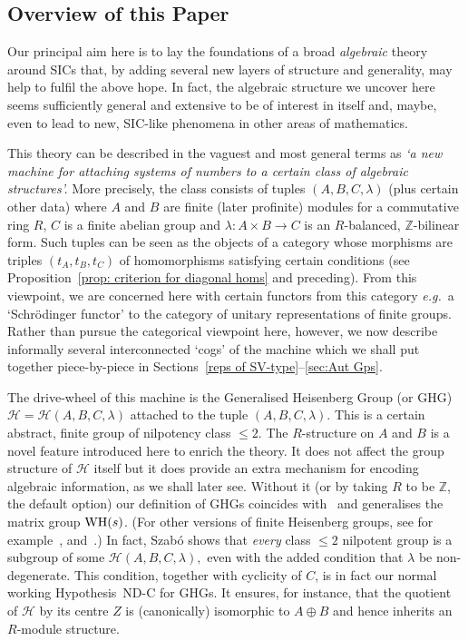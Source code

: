 \documentclass[12pt]{article}
\newcounter{example}[section]
\newcommand{\bbZ}{\ensuremath{\mathbb{Z}}}
\newcommand{\cH}{\ensuremath{\mathcal{H}}}
\newcommand{\eg}{\emph{e.g.}}
\newcommand{\Hei}[4]{\cH({#1},{#2},{#3},{#4})}
\newcommand{\HeiStan}{\Hei{A}{B}{C}{\lambda}}
\begin{document}
\subsection{Overview of this Paper}
Our principal aim here is to lay the foundations of a broad \textit{algebraic} theory around SICs that, by adding several new layers of structure and generality, may help to fulfil the above hope. 
In fact, the algebraic structure we uncover here seems sufficiently general and extensive to be of interest in itself and, maybe, even to lead to new, SIC-like phenomena in other areas of mathematics. 

This theory can be described in the vaguest and most general terms as  \textit{`a new  machine for attaching systems of numbers to a certain class of algebraic structures'.} More precisely, the class consists of tuples  $(A,B,C,\lambda)$ (plus certain other data) where $A$ and $B$  are finite (later profinite) modules for a commutative ring $R$, $C$ is a finite abelian group and $\lambda:A\times B\rightarrow C$ is an $R$-balanced, $\bbZ$-bilinear form. Such tuples can be seen as the objects of a category whose morphisms are triples $(t_A,t_B,t_C)$ of homomorphisms satisfying certain conditions (see Proposition~\ref{prop: criterion for diagonal homs} and preceding). From this viewpoint, we are concerned here  with certain functors from this category \eg\ a `Schr\"odinger functor' to the category of unitary representations of finite groups. Rather than pursue the categorical viewpoint here, however, we now describe informally several interconnected `cogs' of the machine which we shall put together piece-by-piece in Sections~\ref{reps of SV-type}--\ref{sec:Aut Gps}.

 The drive-wheel of this machine is the  Generalised Heisenberg Group (or GHG) $\cH=\HeiStan$ attached to the tuple $(A,B,C,\lambda)$. This is a certain abstract, finite group of nilpotency class $\leq 2$. 
The $R$-structure on $A$ and $B$ is a novel feature introduced here to enrich the theory. It does not affect the group structure of $\cH$ itself but it does  provide an extra mechanism for encoding  algebraic information, as we shall later see. Without it (or by taking $R$ to be $\bbZ$, the default option) our definition of GHGs coincides with~\cite[Def.\ 4.1]{Szabo} and generalises the matrix group ${\rm WH}(s)$. (For other versions of finite Heisenberg groups, see for example~\cite{Tata III}, \cite{Howe} and~\cite{Wi: Heisenberg Gp}.) In fact, Szab\'o shows  that \textit{every} class $\leq 2$ nilpotent group is a subgroup of some $\HeiStan,$ even with the added condition that $\lambda$ be non-degenerate. This condition, together with cyclicity of $C$,  is in fact our normal working Hypothesis~ND-C for GHGs. It ensures, for instance, that the quotient of $\cH$ by its centre $Z$ is (canonically) isomorphic to $A\oplus B$ and hence inherits an $R$-module structure.
\end{document}
